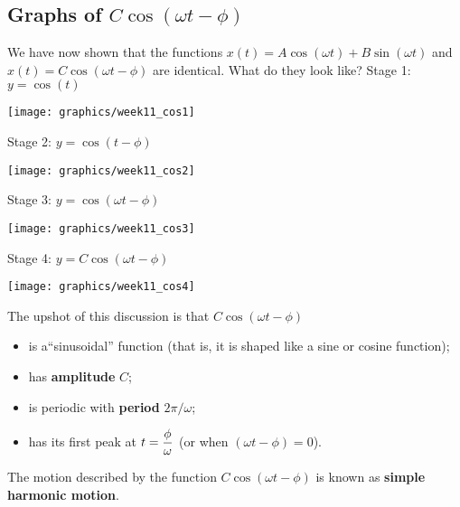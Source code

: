 \documentclass[12pt]{amsart}
\begin{document}


\newpage
{}
\subsection*{Graphs of $C \cos(\omega t - \phi)$ }

We have now shown that the functions $x(t) = A \cos(\omega t) + B \sin(\omega t)$
and $x(t) = C \cos(\omega t - \phi)$ are identical.  What do they look like?
\vfill
Stage 1: $y = \cos(t)$
\begin{center}
\texttt{[image: graphics/week11\_cos1]}
\end{center}
\vfill

Stage 2: $y = \cos(t - \phi)$
\vfill
\begin{center}
\texttt{[image: graphics/week11\_cos2]}
\end{center}

\newpage 

Stage 3: $y = \cos(\omega t - \phi)$
\begin{center}
\texttt{[image: graphics/week11\_cos3]}
\end{center}
\vfill

Stage 4: $y = C \cos(\omega t - \phi)$
\begin{center}
\texttt{[image: graphics/week11\_cos4]}
\end{center}
\vfill

\newpage
The upshot of this discussion is that $C\cos(\omega t - \phi)$ 
\begin{itemize} 
\item is a``sinusoidal'' function (that is, it is shaped like a sine or
cosine function); \\[1ex]
\item has {\bf amplitude} $C$; \\[1ex]
\item is periodic with {\bf period} $2\pi/\omega$; \\[1ex]
\item has its first peak at $\displaystyle t = \frac{\phi}{\omega}$  (or when $(\omega t - \phi) = 0$). \\[1ex]
\end{itemize}
The motion described by the function $C\cos(\omega t - \phi)$ is known
as {\bf simple harmonic motion}.
\end{document}
